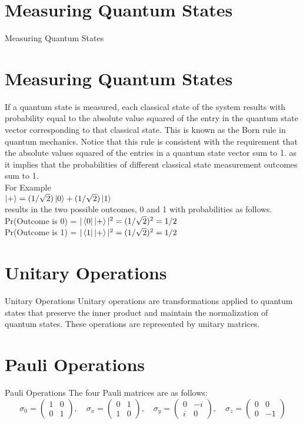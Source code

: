 \documentclass[12pt, aspectratio=169]{beamer}
\begin{document}
\section{Measuring Quantum States}
\begin{frame}{Measuring Quantum States}
   \section{Measuring Quantum States}
If a quantum state is measured, each classical state of the system results with probability equal to the absolute value squared of the entry in the quantum state vector corresponding to that classical state. This is known as the Born rule in quantum mechanics. Notice that this rule is consistent with the requirement that the absolute values squared of the entries in a quantum state vector sum to 1. as it implies that the probabilities of different classical state measurement outcomes sum to 1.\\
For Example \\
$\ket{+}= (1/\sqrt{2})\ket{0}+(1/\sqrt{2})\ket{1}$\\
results in the two possible outcomes, 0 and 1 with probabilities as follows.\\
Pr(Outcome is 0) = $|\bra{0}\ket{+}|^2 = (1/\sqrt{2})^2 = 1/2$\\
Pr(Outcome is 1) = $|\bra{1}\ket{+}|^2 = (1/\sqrt{2})^2 = 1/2$\\
\end{frame}

\section{Unitary Operations}
\begin{frame}{Unitary Operations}
    Unitary operations are transformations applied to quantum states that preserve the inner product and maintain the normalization of quantum states. These operations are represented by unitary matrices.
\end{frame}

\section{Pauli Operations}
\begin{frame}{Pauli Operations}
    The four Pauli matrices are as follows:
    \[
    \sigma_0 = \begin{pmatrix} 1 & 0\\ 0 & 1 \end{pmatrix}, \quad
    \sigma_x = \begin{pmatrix} 0 & 1\\ 1 & 0 \end{pmatrix}, \quad
    \sigma_y = \begin{pmatrix} 0 & -i\\ i & 0 \end{pmatrix}, \quad
    \sigma_z = \begin{pmatrix} 0 & 0\\ 0 & -1 \end{pmatrix}
    \]
\end{frame}
\end{document}
